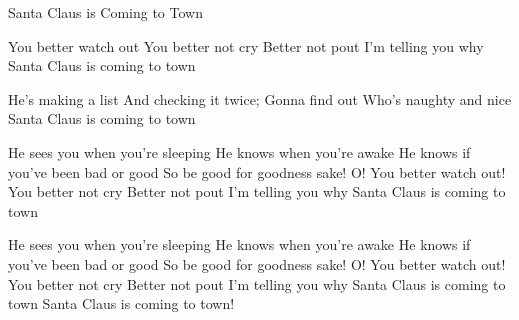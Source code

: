 \begin{sang}{Santa Claus is Coming to Town}{}
\begin{vers}
You better watch out
You better not cry
Better not pout
I'm telling you why
Santa Claus is coming to town
\end{vers}
\begin{vers}
He's making a list
And checking it twice;
Gonna find out Who's naughty and nice
Santa Claus is coming to town
\end{vers}
\begin{vers}
He sees you when you're sleeping
He knows when you're awake
He knows if you've been bad or good
So be good for goodness sake!
O! You better watch out!
You better not cry
Better not pout
I'm telling you why
Santa Claus is coming to town
\end{vers}
\begin{vers}
He sees you when you're sleeping
He knows when you're awake
He knows if you've been bad or good
So be good for goodness sake!
O! You better watch out!
You better not cry
Better not pout
I'm telling you why
Santa Claus is coming to town
Santa Claus is coming to town!
\end{vers}
\end{sang}